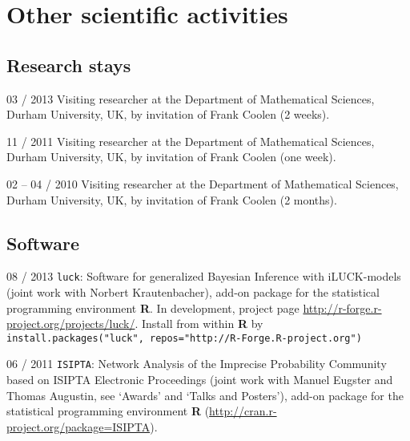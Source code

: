 \documentclass[a4paper]{simplecv}
\begin{document}

\section{Other scientific activities}
\label{other}

\subsection{Research stays}
\begin{topic}
\item[03 / 2013] Visiting researcher at the Department of Mathematical Sciences, Durham University, UK,
                 by invitation of Frank Coolen (2 weeks).
\item[11 / 2011] Visiting researcher at the Department of Mathematical Sciences, Durham University, UK,
                 by invitation of Frank Coolen (one week).
\item[02 -- 04 / 2010] Visiting researcher at the Department of Mathematical Sciences, Durham University, UK,
                 by invitation of Frank Coolen (2 months).
\end{topic}

\subsection{Software}

\begin{topic}
\item[08 / 2013] \texttt{luck}: Software for generalized Bayesian Inference with iLUCK-models (joint work with Norbert Krautenbacher),
                 add-on package for the statistical programming environment \textbf{R}. In development, project page
                 \url{http://r-forge.r-project.org/projects/luck/}.
                 Install from within \textbf{R} by\\ \texttt{install.packages("luck", repos="http://R-Forge.R-project.org")}
\item[06 / 2011] \texttt{ISIPTA}: Network Analysis of the Imprecise Probability Community based on ISIPTA Electronic Proceedings
                 (joint work with Manuel Eugster and Thomas Augustin, see `Awards' and `Talks and Posters'),
                 add-on package for the statistical programming environment \textbf{R} (\url{http://cran.r-project.org/package=ISIPTA}).
\end{topic}
\end{document}
